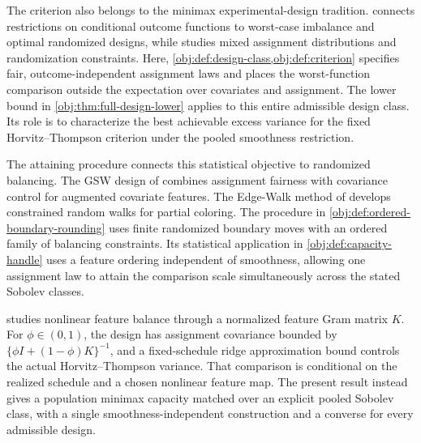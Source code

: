 The criterion also belongs to the minimax experimental-design tradition. \citet[Sections 2.2--2.4]{Kallus2018} connects restrictions on conditional outcome functions to worst-case imbalance and optimal randomized designs, while \citet[Sections 3--5]{Kallus2020} studies mixed assignment distributions and randomization constraints. Here, \cref{obj:def:design-class,obj:def:criterion} specifies fair, outcome-independent assignment laws and places the worst-function comparison outside the expectation over covariates and assignment. The lower bound in \cref{obj:thm:full-design-lower} applies to this entire admissible design class. Its role is to characterize the best achievable excess variance for the fixed Horvitz--Thompson criterion under the pooled smoothness restriction.

The attaining procedure connects this statistical objective to randomized balancing. The GSW design of \citet[Lemma 6.1 and Theorem 6.3]{HarshawSavjeSpielmanZhang2024GSW} combines assignment fairness with covariance control for augmented covariate features. The Edge-Walk method of \citet[Section 2.1]{LovettMeka2015EdgeWalk} develops constrained random walks for partial coloring. The procedure in \cref{obj:def:ordered-boundary-rounding} uses finite randomized boundary moves with an ordered family of balancing constraints. Its statistical application in \cref{obj:def:capacity-handle} uses a feature ordering independent of smoothness, allowing one assignment law to attain the comparison scale simultaneously across the stated Sobolev classes.

\citet[Lemma 4.2 and Proposition 5.1]{Chen2026} studies nonlinear feature balance through a normalized feature Gram matrix \(K\). For \(\phi\in(0,1)\), the design has assignment covariance bounded by \(\{\phi I+(1-\phi)K\}^{-1}\), and a fixed-schedule ridge approximation bound controls the actual Horvitz--Thompson variance. That comparison is conditional on the realized schedule and a chosen nonlinear feature map. The present result instead gives a population minimax capacity matched over an explicit pooled Sobolev class, with a single smoothness-independent construction and a converse for every admissible design.

